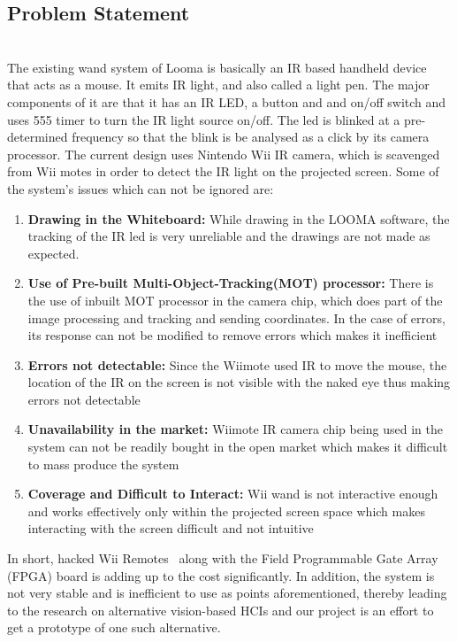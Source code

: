 \documentclass[12pt, a4paper]{article}
\begin{document}
\subsection{Problem Statement}
~\\
The existing wand system of Looma is basically an IR based handheld device that acts as a mouse. It emits IR light, and also called a light pen. The major components of it are that it has an IR LED, a button and and on/off switch and uses 555 timer to turn the IR light source on/off. The led is blinked at a pre-determined frequency so that the blink is be analysed as a click by its camera processor. The current design uses Nintendo Wii IR camera, which is scavenged from Wii motes in order to detect the IR light on the projected screen. Some of the system's issues which can not be ignored are:

\begin{enumerate}
\item \textbf {Drawing in the Whiteboard:} While drawing in the LOOMA software, the tracking of the IR led is very unreliable and the drawings are not made as expected.
\item \textbf{Use of Pre-built Multi-Object-Tracking(MOT) processor:} There is the use of inbuilt MOT processor in the camera chip, which does part of the image processing and tracking and sending coordinates. In the case of errors, its response can not be modified to remove errors which makes it inefficient
\item \textbf{Errors not detectable:} Since the Wiimote used IR to move the mouse, the location of the IR on the screen is not visible with the naked eye thus making errors not detectable 
\item \textbf{Unavailability in the market:} Wiimote IR camera chip being used in the system can not be readily bought in the open market which makes it difficult to mass produce the system
\item \textbf{Coverage and Difficult to Interact:} Wii wand is not interactive enough and works effectively only within the projected screen space which makes interacting with the screen difficult and not intuitive
\end{enumerate}

In short, hacked Wii Remotes~\cite{joh} along with the Field Programmable Gate Array (FPGA) board is adding up to the cost significantly. In addition, the system is not very stable and is inefficient to use as points aforementioned, thereby leading to the research on alternative vision-based HCIs and our project is an effort to get
a prototype of one such alternative.
\end{document}
